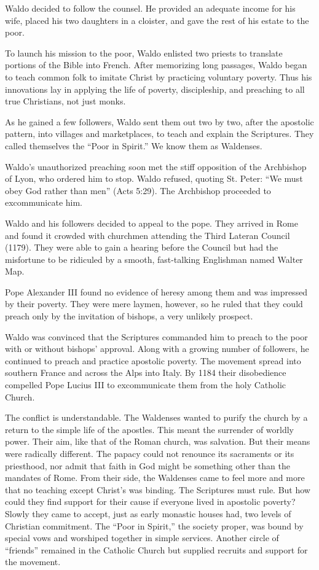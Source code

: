 Waldo decided to follow the counsel. He provided an adequate income for his wife, placed his two
daughters in a cloister, and gave the rest of his estate to the poor.

To launch his mission to the poor, Waldo enlisted two priests to translate portions of the Bible
into French. After memorizing long passages, Waldo began to teach common folk to imitate Christ by
practicing voluntary poverty. Thus his innovations lay in applying the life of poverty,
discipleship, and preaching to all true Christians, not just monks.

As he gained a few followers, Waldo sent them out two by two, after the apostolic pattern, into
villages and marketplaces, to teach and explain the Scriptures. They called themselves the “Poor in
Spirit.” We know them as Waldenses.

Waldo’s unauthorized preaching soon met the stiff opposition of the Archbishop of Lyon, who ordered
him to stop. Waldo refused, quoting St. Peter: “We must obey God rather than men” (Acts 5:29). The
Archbishop proceeded to excommunicate him.

Waldo and his followers decided to appeal to the pope. They arrived in Rome and found it crowded
with churchmen attending the Third Lateran Council (1179). They were able to gain a hearing before
the Council but had the misfortune to be ridiculed by a smooth, fast-talking Englishman named Walter
Map.

Pope Alexander III found no evidence of heresy among them and was impressed by their poverty. They
were mere laymen, however, so he ruled that they could preach only by the invitation of bishops, a
very unlikely prospect.

Waldo was convinced that the Scriptures commanded him to preach to the poor with or without bishops’
approval. Along with a growing number of followers, he continued to preach and practice apostolic
poverty. The movement spread into southern France and across the Alps into Italy. By 1184 their
disobedience compelled Pope Lucius III to excommunicate them from the holy Catholic Church.

The conflict is understandable. The Waldenses wanted to purify the church by a return to the simple
life of the apostles. This meant the surrender of worldly power. Their aim, like that of the Roman
church, was salvation. But their means were radically different. The papacy could not renounce its
sacraments or its priesthood, nor admit that faith in God might be something other than the mandates
of Rome. From their side, the Waldenses came to feel more and more that no teaching except Christ’s
was binding. The Scriptures must rule. But how could they find support for their cause if everyone
lived in apostolic poverty? Slowly they came to accept, just as early monastic houses had, two
levels of Christian commitment. The “Poor in Spirit,” the society proper, was bound by special vows
and worshiped together in simple services. Another circle of “friends” remained in the Catholic
Church but supplied recruits and support for the movement.

